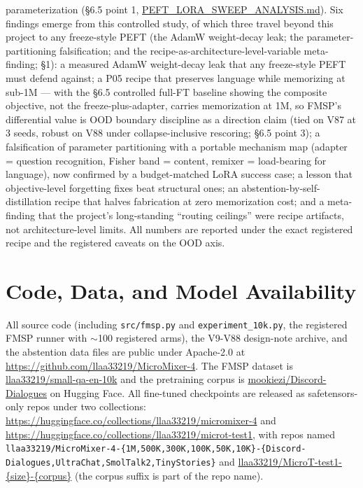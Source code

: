 \documentclass[11pt]{article}
\begin{document}
parameterization (\S6.5 point 1, \href{https://github.com/llaa33219/MicroMixer-4/blob/4bb630413dfa58ef3141291e121ab8c006d03235/PEFT_LORA_SWEEP_ANALYSIS.md}{PEFT\_LORA\_SWEEP\_ANALYSIS.md}). Six findings emerge from this controlled study, of which three travel beyond this project to any freeze-style PEFT (the AdamW weight-decay leak; the parameter-partitioning falsification; and the recipe-as-architecture-level-variable meta-finding; \S1): a measured AdamW weight-decay leak that any freeze-style PEFT must defend against; a P05 recipe that preserves language while memorizing at sub-1M --- with the \S6.5 controlled full-FT baseline showing the composite objective, not the freeze-plus-adapter, carries memorization at 1M, so FMSP's differential value is OOD boundary discipline as a direction claim (tied on V87 at 3 seeds, robust on V88 under collapse-inclusive rescoring; \S6.5 point 3); a falsification of parameter partitioning with a portable mechanism map (adapter = question recognition, Fisher band = content, remixer = load-bearing for language), now confirmed by a budget-matched LoRA success case; a lesson that objective-level forgetting fixes beat structural ones; an abstention-by-self-distillation recipe that halves fabrication at zero memorization cost; and a meta-finding that the project's long-standing ``routing ceilings'' were recipe artifacts, not architecture-level limits. All numbers are reported under the exact registered recipe and the registered caveats on the OOD axis.

\section*{Code, Data, and Model Availability}

All source code (including \texttt{src/fmsp.py} and \texttt{experiment\_10k.py}, the registered FMSP runner with $\sim$100 registered arms), the V9-V88 design-note archive, and the abstention data files are public under Apache-2.0 at \url{https://github.com/llaa33219/MicroMixer-4}. The FMSP dataset is \url{llaa33219/small-qa-en-10k} and the pretraining corpus is \url{mookiezi/Discord-Dialogues} on Hugging Face. All fine-tuned checkpoints are released as safetensors-only repos under two collections: \url{https://huggingface.co/collections/llaa33219/micromixer-4} and \url{https://huggingface.co/collections/llaa33219/microt-test1}, with repos named \texttt{llaa33219/MicroMixer-4-\allowbreak\{1M,500K,300K,100K,50K,10K\}-\allowbreak\{Discord-Dialogues,\allowbreak UltraChat,\allowbreak SmolTalk2,\allowbreak TinyStories\}} and \url{llaa33219/MicroT-test1-{size}-{corpus}} (the corpus suffix is part of the repo name).
\end{document}
